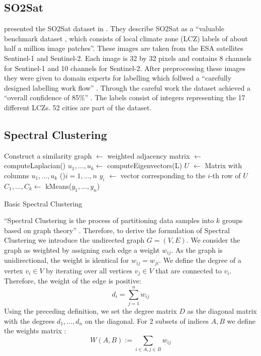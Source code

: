 \subsection{SO2Sat}
\label{subsec:so2sat}
\citeauthor{zhu_so2sat_2019} presented the SO2Sat dataset in \cite{zhu_so2sat_2019}. They describe SO2Sat as a \enquote{valuable benchmark dataset \textelp{}, which consists of local climate zone (LCZ) labels of about half a million \textelp{} image patches}.
These images are taken from the ESA satellites Sentinel-1 and Sentinel-2. Each image is 32 by 32 pixels and contains 8 channels for Sentinel-1 and 10 channels for Sentinel-2.
After preprocessing these images they were given to domain experts for labelling which follwed a \enquote{carefully designed labelling work flow} \cite{zhu_so2sat_2019}.
Through the careful work the dataset achieved a \enquote{overall confidence of 85\%} \cite{zhu_so2sat_2019}.
The labels consist of integers representing the 17 different \glspl{LCZ}. 52 cities are part of the dataset.

\subsection{Spectral Clustering}
\label{subsec:spectral_clustering}

\begin{algorithm}[b]
  Construct a similarity graph\;
  \Adj \(\leftarrow\) weighted adjacency matrix\;
  \Laplace \(\leftarrow\) computeLaplacian(\Adj)\;
  \(u_1, \ldots, u_k \leftarrow\) computeEigenvectors(L)\;
  \(U\) \(\leftarrow\) Matrix with columns \(u_1, \ldots, u_k\)\;
  \ForEach(){\(i = 1, \ldots, n\)}{
    \(y_i\) \(\leftarrow\) vector corresponding to the \(i\)-th row of \(U\)
  }
\(C_1, \ldots, C_k \leftarrow\) kMeans(\(y_1, \ldots, y_n\))\;

  \caption{Basic Spectral Clustering}\label{alg:basic_spectral}
 \end{algorithm}

\enquote{Spectral Clustering is the process of partitioning data samples into
\(k\) groups based on graph theory} \cite{krajsek_helmholtz_nodate}. Therefore,
to derive the formulation of Spectral Clustering we introduce the undirected graph \(G=(V, E)\).
We consider the graph as weighted by assigning each edge a weight \(w_{ij}\). As the graph
is unidirectional, the weight is identical for \(w_{ij} = w_{ji} \).
We define the degree of a vertex \(v_i \in V\) by iterating over all vertices \(v_j \in V\) that are connected to \(v_i\).
Therefore, the weight of the edge is positive:
\[d_i = \sum_{j=1}^n w_{ij}\]
Using the preceding definition, we set the degree matrix \(D\) as the diagonal matrix with the degrees \(d_1, \ldots, d_n\) on the diagonal.
\cite{von_luxburg_tutorial_2007}
For 2 subsets of indices \(A, B\) we define the weights matrix \cite{von_luxburg_tutorial_2007}:
\[W(A, B) := \sum_{i \in A, j \in B} w_{ij}\]


